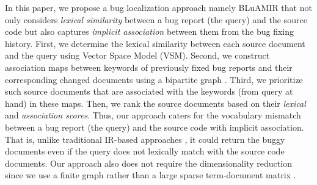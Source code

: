 \documentclass[conference]{IEEEtran}
\begin{document}
\begin{table}[!tb]
	\caption{An Example Bug Report (\#95167, eclipse.jdt.core)}
	\label{tab:BugInfo}
	\vspace{-.2cm}
	    \vspace{-.5cm}
\end{table}


In this paper, we propose a bug localization approach namely BLuAMIR that not only considers \emph{lexical similarity} between a bug report (the query) and the source code but also captures \emph{implicit association} between them from the bug fixing history. First, we determine the lexical similarity between each source document and the query using Vector Space Model (VSM).
Second, we construct association maps between keywords of previously fixed bug reports and their corresponding changed documents using a bipartite graph \cite{bipartite}. Third, we prioritize such source documents that are associated with the keywords (from query at hand) in these maps. Then, we rank the source documents based on their \emph{lexical} and \emph{association scores}.
Thus, our approach caters for the vocabulary mismatch between a bug report (the query) and the source code with implicit association. 
That is, unlike traditional IR-based approaches \cite{Jian,Saha}, it could return the buggy documents even if the query does not lexically match with the source code documents. Our approach also does not require the dimensionality reduction since we use a finite graph rather than a large sparse term-document matrix \cite{MarcusLSI,MarcusMaletic}.
\end{document}
